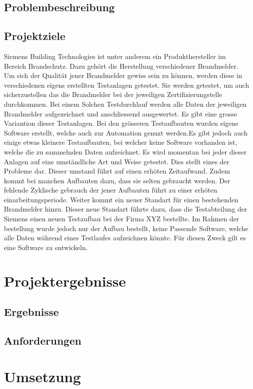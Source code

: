 \documentclass[10pt]{scrartcl}
\begin{document}
\subsection{Problembeschreibung}
\subsection{Projektziele}
Siemens Building Technologies ist unter anderem ein Produkthersteller im Bereich Brandschutz. Dazu gehört die Herstellung verschiedener Brandmelder. Um sich der Qualität jener Brandmelder gewiss sein zu können, werden diese in verschiedenen eigens erstellten Testanlagen getestet. Sie werden getestet, um auch sicherzustellen das die Brandmelder bei der jeweiligen Zertifizierungstelle durchkommen. Bei einem Solchen Testdurchlauf werden alle Daten der jeweiligen Brandmelder aufgezeichnet und anschliessend ausgewertet.\newline
Es gibt eine grosse Variantion dieser Testanlagen. Bei den grösseren Testaufbauten wurden eigene Software erstellt, welche auch zur Automation genuzt werden.Es gibt jedoch auch einige etwas kleinere Testaufbauten, bei welcher keine Software vorhanden ist, welche die zu sammelnden Daten aufzeichnet. Es wird momentan bei jeder dieser Anlagen auf eine umständliche Art und Weise getestet.
Dies stellt eines der Probleme dar. Dieser umstand führt auf einen erhöten Zeitaufwand. Zudem kommt bei manchen Aufbauten dazu, dass sie selten gebraucht werden. Der fehlende Zyklische gebrauch der jener Aufbauten führt zu einer erhöten einarbeitungsperiode.
Weiter kommt ein neuer Standart für einen bestehenden Brandmelder hinzu. Dieser neue Standart führte dazu, dass die Testabteilung der Siemens einen neuen Testaufbau bei der Firma XYZ bestellte. Im Rahmen der bestellung wurde jedoch nur der Aufbau bestellt, keine Passende Software, welche alle Daten während eines Testlaufes aufzeichnen könnte. Für diesen Zweck gilt es eine Software zu entwickeln. 
\section{Projektergebnisse}
\subsection{Ergebnisse}
\subsection{Anforderungen}	

\section{Umsetzung}
\end{document}
